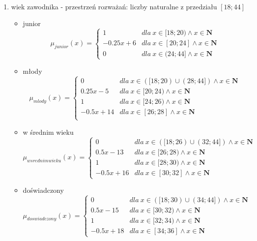 \documentclass{classrep}
\begin{document}
\begin{enumerate}
    \item wiek zawodnika - przestrzeń rozważań: liczby naturalne z przedziału $[18;44]$
    \begin{itemize}
        \item junior
        \begin{equation}
            \mu_{junior}(x) = \left\{\begin{matrix} 1 & dla \: x\in[18;20) \wedge x\in \mathbf{N} \\ -0.25x + 6 & dla \: x\in [20; 24] \wedge x\in \mathbf{N} \\ 0 & dla \: x\in (24;44] \wedge x\in \mathbf{N} \end{matrix}\right.
        \end{equation}
        \item młody
        \begin{equation}
            \mu_{mlody}(x) = \left\{\begin{matrix}  0 & dla \: x\in ([18;20) \cup (28;44])  \wedge x\in \mathbf{N} \\ 0.25x-5 & dla \: x\in[20;24) \wedge x\in \mathbf{N} \\ 1 & dla \: x\in [24; 26) \wedge x\in \mathbf{N} \\ -0.5x + 14 & dla \: x\in[26;28] \wedge x\in \mathbf{N} \\\end{matrix}\right.
        \end{equation}
        \item w średnim wieku
        \begin{equation}
            \mu_{w srednim wieku}(x) = \left\{\begin{matrix} 0 & dla \: x\in ([18;26) \cup (32;44] ) \wedge x\in \mathbf{N} \\ 0.5x - 13 & dla \: x\in[26;28) \wedge x\in \mathbf{N} \\ 1 & dla \: x\in [28; 30) \wedge x\in \mathbf{N} \\ -0.5x + 16 & dla \: x\in[30;32] \wedge x\in \mathbf{N}  \end{matrix}\right.
        \end{equation}
        \item doświadczony
        \begin{equation}
            \mu_{doswiadczony}(x) = \left\{\begin{matrix}  0 & dla \: x\in ([18;30) \cup  (34;44] )  \wedge x\in \mathbf{N} \\ 0.5x - 15 & dla \: x\in[30;32)  \wedge x\in \mathbf{N}\\ 1 & dla \: x\in [32; 34) \wedge x\in \mathbf{N} \\ -0.5x + 18 & dla \: x\in[34;36]  \wedge x\in \mathbf{N} \end{matrix}\right.

\end{equation}
\end{itemize}
\end{enumerate}
\end{document}
